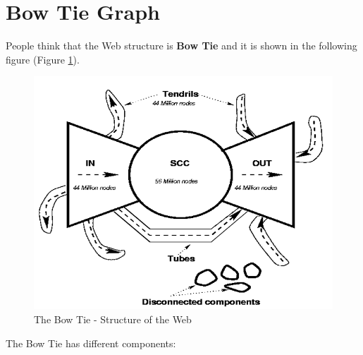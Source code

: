 \section{Bow Tie Graph}
People think that the Web structure is \textbf{Bow Tie} and it is shown in the following figure (Figure \ref{fig:bowtie}).
\begin{figure}
    \centering
    \includegraphics[width=0.75\linewidth]{images/bowtie.png}
    \caption{The Bow Tie - Structure of the Web}
    \label{fig:bowtie}
\end{figure}
The Bow Tie has different components:
